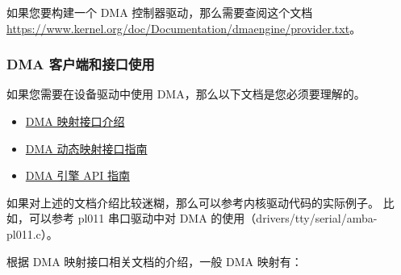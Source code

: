 如果您要构建一个 DMA 控制器驱动，那么需要查阅这个文档
\url{https://www.kernel.org/doc/Documentation/dmaengine/provider.txt}。

\subsubsection{DMA 客户端和接口使用}

如果您需要在设备驱动中使用 DMA，那么以下文档是您必须要理解的。

\begin{itemize}
  \item \href{https://www.kernel.org/doc/Documentation/DMA-API.txt}{DMA 映射接口介绍}
  \item \href{https://www.kernel.org/doc/Documentation/DMA-API-HOWTO.txt}{DMA 动态映射接口指南}
  \item \href{https://www.kernel.org/doc/Documentation/dmaengine/client.txt}{DMA 引擎 API 指南}
\end{itemize}

如果对上述的文档介绍比较迷糊，那么可以参考内核驱动代码的实际例子。
比如，可以参考 pl011 串口驱动中对 DMA 的使用（drivers/tty/serial/amba-pl011.c）。

根据 DMA 映射接口相关文档的介绍，一般 DMA 映射有：

